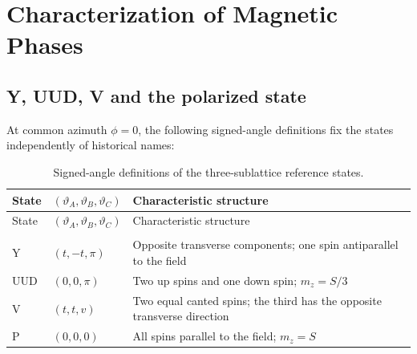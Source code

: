 \clearpage

\section{Characterization of Magnetic Phases}\label{sec-nbcp-phase-characterization}

\subsection{Y, UUD, V and the polarized
state}\label{y-uud-v-and-the-polarized-state}

At common azimuth \(\phi=0\), the following signed-angle definitions fix
the states independently of historical names:

\begin{longtable}[]{@{}
  >{\raggedright\arraybackslash}p{}
  >{\raggedright\arraybackslash}p{}
  >{\raggedright\arraybackslash}p{}@{}}
\toprule\noalign{}
\begin{minipage}[b]{\linewidth}\raggedright
State
\end{minipage} & \begin{minipage}[b]{\linewidth}\raggedright
\((\vartheta_A,\vartheta_B,\vartheta_C)\)
\end{minipage} & \begin{minipage}[b]{\linewidth}\raggedright
Characteristic structure
\end{minipage} \\
\midrule\noalign{}
\endfirsthead
\toprule\noalign{}
\begin{minipage}[b]{\linewidth}\raggedright
State
\end{minipage} & \begin{minipage}[b]{\linewidth}\raggedright
\((\vartheta_A,\vartheta_B,\vartheta_C)\)
\end{minipage} & \begin{minipage}[b]{\linewidth}\raggedright
Characteristic structure
\end{minipage} \\
\midrule\noalign{}
\endhead
\bottomrule\noalign{}
\caption{Signed-angle definitions of the three-sublattice reference states.}\label{tab-nbcp-03-phase-diagram-2}\\
\endlastfoot
Y & \((t,-t,\pi)\) & Opposite transverse components; one spin
antiparallel to the field \\
UUD & \((0,0,\pi)\) & Two up spins and one down spin; \(m_z=S/3\) \\
V & \((t,t,v)\) & Two equal canted spins; the third has the opposite
transverse direction \\
P & \((0,0,0)\) & All spins parallel to the field; \(m_z=S\) \\
\end{longtable}

